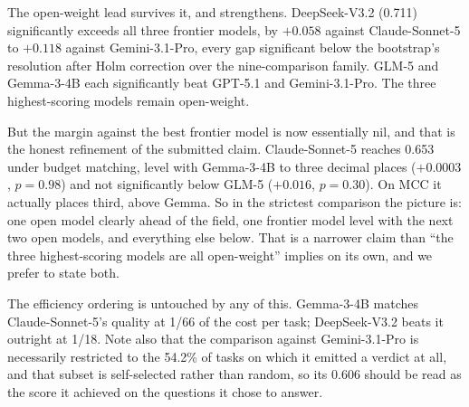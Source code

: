\documentclass[computers,article,submit,moreauthors]{Definitions/mdpi}
\begin{document}
The open-weight lead survives it, and strengthens. DeepSeek-V3.2 (0.711) significantly exceeds all three frontier models, by $+0.058$ against Claude-Sonnet-5 to $+0.118$ against Gemini-3.1-Pro, every gap significant below the bootstrap's resolution after Holm correction over the nine-comparison family. GLM-5 and Gemma-3-4B each significantly beat GPT-5.1 and Gemini-3.1-Pro. The three highest-scoring models remain open-weight.

But the margin against the best frontier model is now essentially nil, and that is the honest refinement of the submitted claim. Claude-Sonnet-5 reaches 0.653 under budget matching, level with Gemma-3-4B to three decimal places ($+0.0003$, $p=0.98$) and not significantly below GLM-5 ($+0.016$, $p=0.30$). On MCC it actually places third, above Gemma. So in the strictest comparison the picture is: one open model clearly ahead of the field, one frontier model level with the next two open models, and everything else below. That is a narrower claim than ``the three highest-scoring models are all open-weight'' implies on its own, and we prefer to state both.

The efficiency ordering is untouched by any of this. Gemma-3-4B matches Claude-Sonnet-5's quality at 1/66 of the cost per task; DeepSeek-V3.2 beats it outright at 1/18. Note also that the comparison against Gemini-3.1-Pro is necessarily restricted to the 54.2\% of tasks on which it emitted a verdict at all, and that subset is self-selected rather than random, so its 0.606 should be read as the score it achieved on the questions it chose to answer.
\end{document}
